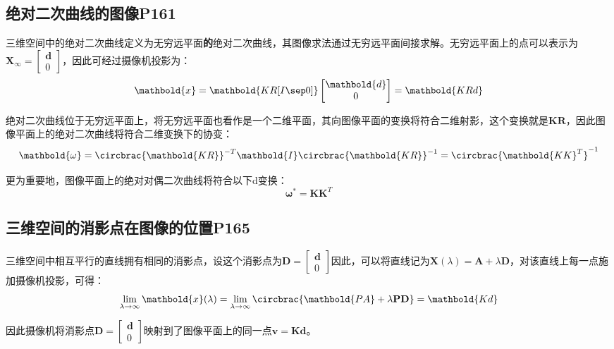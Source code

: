 \documentclass[11pt]{article}
\begin{document}
\subsection{绝对二次曲线的图像P161}
三维空间中的绝对二次曲线定义为无穷远平面\textbf{的}绝对二次曲线，其图像求法通过无穷远平面间接求解。无穷远平面上的点可以表示为$\mathbold{X}_\infty=\begin{bmatrix}
    \mathbold{d} \\ 0
  \end{bmatrix}$，因此可经过摄像机投影为：
\begin{equation*}
  \mathbold{x}=\mathbold{KR[I\sep 0]}\begin{bmatrix}
    \mathbold{d} \\ 0
  \end{bmatrix}=\mathbold{KRd}
\end{equation*}\par
绝对二次曲线位于无穷远平面上，将无穷远平面也看作是一个二维平面，其向图像平面的变换将符合二维射影，这个变换就是$\mathbold{KR}$，因此图像平面上的绝对二次曲线将符合二维变换下的协变：
\begin{equation*}
  \mathbold{\omega}=\circbrac{\mathbold{KR}}^{-T}\mathbold{I}\circbrac{\mathbold{KR}}^{-1}=\circbrac{\mathbold{KK}^T}^{-1}
\end{equation*}\par
更为重要地，图像平面上的绝对对偶二次曲线将符合以下d变换：
\begin{equation*}
  \mathbold{\omega}^*=\mathbold{KK}^T
\end{equation*}\par
\subsection{三维空间的消影点在图像的位置P165}
三维空间中相互平行的直线拥有相同的消影点，设这个消影点为$\mathbf{D}=\begin{bmatrix}
    \mathbold{d} \\ 0
  \end{bmatrix}$因此，可以将直线记为$\mathbold{X}(\lambda)=\mathbold{A}+\lambda\mathbf{D}$，对该直线上每一点施加摄像机投影，可得：
\begin{equation*}
  \lim_{\lambda\to\infty}\mathbold{x}(\lambda)=\lim_{\lambda\to\infty}\circbrac{\mathbold{PA}+\lambda\mathbf{PD}}=\mathbold{Kd}
\end{equation*}\par
因此摄像机将消影点$\mathbf{D}=\begin{bmatrix}
    \mathbold{d} \\ 0
  \end{bmatrix}$映射到了图像平面上的同一点$\mathbold{v=Kd}$。
\end{document}
